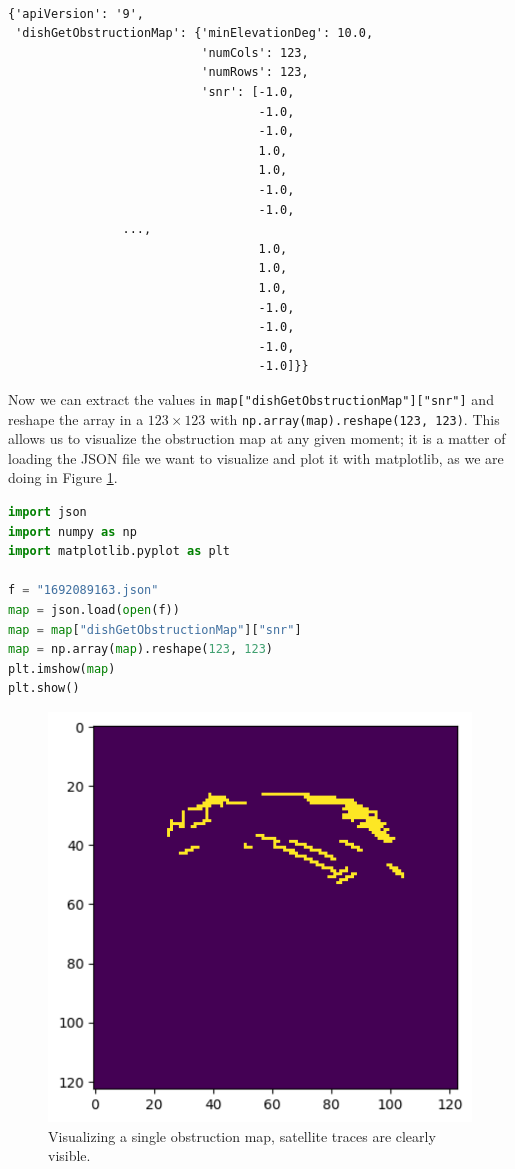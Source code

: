 \documentclass[IN,11pt,twoside,openright,idp,english]{tumthesis}
\begin{document}
\begin{lstlisting}[caption={data from the \texttt{dish\_get\_obstruction\_map} function},captionpos=b]

{'apiVersion': '9',
 'dishGetObstructionMap': {'minElevationDeg': 10.0,
                           'numCols': 123,
                           'numRows': 123,
                           'snr': [-1.0,
                                   -1.0,
                                   -1.0,
                                   1.0,
                                   1.0,
                                   -1.0,
                                   -1.0,
                ...,
                                   1.0,
                                   1.0,
                                   1.0,
                                   -1.0,
                                   -1.0,
                                   -1.0,
                                   -1.0]}}  
\end{lstlisting}

Now we can extract the values in \texttt{map["dishGetObstructionMap"]["snr"]} and reshape the array in a $123\times123$ with \texttt{np.array(map).reshape(123, 123)}. This allows us to visualize the obstruction map at any given moment; it is a matter of loading the JSON file we want to visualize and plot it with matplotlib, as we are doing in Figure \ref{fig:vis-single-map}.

\begin{lstlisting}[language=python,caption={visualizing a single obstruction map},captionpos=b]
import json
import numpy as np
import matplotlib.pyplot as plt

f = "1692089163.json"
map = json.load(open(f))
map = map["dishGetObstructionMap"]["snr"]
map = np.array(map).reshape(123, 123)
plt.imshow(map)
plt.show()
\end{lstlisting}

\begin{figure}
    \centering
    \includegraphics[width=0.5\columnwidth]{img/single_map.png}
    \caption{Visualizing a single obstruction map, satellite traces are clearly visible.}
    \label{fig:vis-single-map}
\end{figure}
\end{document}
